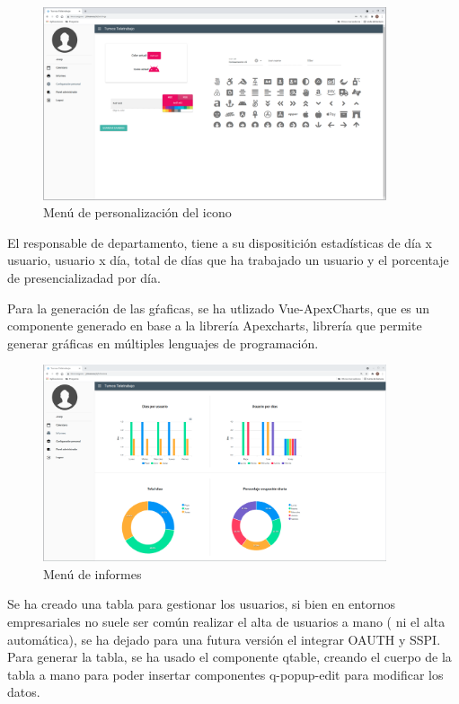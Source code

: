 \documentclass[11pt,spanish,listoffigures,listoftables]{tfgetsinf}
\begin{document}
\begin{figure}[ht!] %
  \includegraphics[width=0.90\textwidth]{img/opcionesweb.png}
  \caption{Menú de personalización del icono}
  \label{fig:menupersonalizacion}
\end{figure}

El responsable de departamento, tiene a su dispositición estadísticas de día x usuario, usuario x día, total de días que ha trabajado un usuario y el porcentaje de presencializadad por día. 

Para la generación de las gŕaficas, se ha utlizado Vue-ApexCharts, que es un componente generado en base a la librería Apexcharts, librería que permite generar gráficas en múltiples lenguajes de programación.

\begin{figure}[ht!] %
  \includegraphics[width=0.90\textwidth]{img/informes.png}
  \caption{Menú de informes}
  \label{fig:menuinformes}
\end{figure}

Se ha creado una tabla para gestionar los usuarios, si bien en entornos empresariales no suele ser común realizar el alta de usuarios a mano ( ni el alta automática), se ha dejado para una futura versión el integrar OAUTH  y SSPI.
Para generar la tabla, se ha usado el componente qtable, creando el cuerpo de la tabla a mano para poder insertar componentes q-popup-edit para modificar los datos. 
\end{document}
